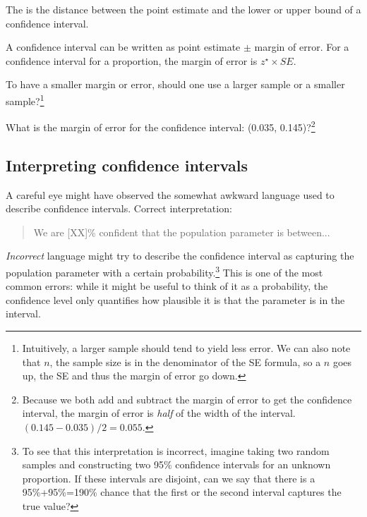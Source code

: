 The  is the distance between the point estimate and the lower or upper bound of a confidence interval.

\begin{termBox}{\label{marginOfErrorTermBox}
A confidence interval can be written as point estimate $\pm$ margin of error.
\newline For a confidence interval for a proportion, the margin of error is $z^{\star}\times SE$.}
\end{termBox}

\begin{exercise}To have a smaller margin or error, should one use a larger sample or a smaller sample?\footnote{Intuitively, a larger sample should tend to yield less error. We can also note that $n$, the sample size is in the denominator of the SE formula, so a $n$ goes up, the SE and thus the margin of error go down.}
\end{exercise}

\begin{exercise}What is the margin of error for the confidence interval: (0.035, 0.145)?\footnote{Because we both add and subtract the margin of error to get the confidence interval, the margin of error is \emph{half} of the width of the interval. $(0.145 - 0.035)/2=0.055$.}
\end{exercise}

\subsection{Interpreting confidence intervals}
\label{interpretingCIs}


A careful eye might have observed the somewhat awkward language used to describe confidence intervals. Correct interpretation:
\begin{quote}
We are [XX]\% confident that the population parameter is between...
\end{quote}
\emph{Incorrect} language might try to describe the confidence interval as capturing the population parameter with a certain probability.\footnote{To see that this interpretation is incorrect, imagine taking two random samples and constructing two 95\% confidence intervals for an unknown proportion. If these intervals are disjoint, can we say that there is a 95\%+95\%=190\% chance that the first or the second interval captures the true value?} This is one of the most common errors: while it might be useful to think of it as a probability, the confidence level only quantifies how plausible it is that the parameter is in the interval.

